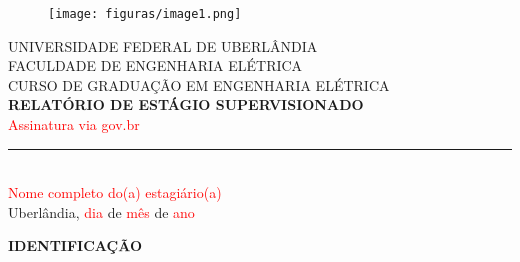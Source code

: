 \documentclass[12pt]{article}
\begin{document}
\thispagestyle{empty}

\begin{figure}[H]
    \centering
    \texttt{[image: figuras/image1.png]}
    \label{fig:ufu}
\end{figure}

\begin{center}
    UNIVERSIDADE FEDERAL DE UBERLÂNDIA \\
    FACULDADE DE ENGENHARIA ELÉTRICA \\
    CURSO DE GRADUAÇÃO EM ENGENHARIA ELÉTRICA \\[7cm]

    \textbf{RELATÓRIO DE ESTÁGIO SUPERVISIONADO} \\[7cm]

   \textcolor{red}{Assinatura via gov.br} \\[0.3cm]
    \rule{6.5cm}{0.4pt} \\[0.3cm]
    \textcolor{red}{Nome completo do(a) estagiário(a)} \\[0.8cm]
    Uberlândia, \textcolor{red}{dia} de \textcolor{red}{mês} de \textcolor{red}{ano}
\end{center}

\newpage

\begin{center}
    \textbf{IDENTIFICAÇÃO}
\end{center}
\end{document}
